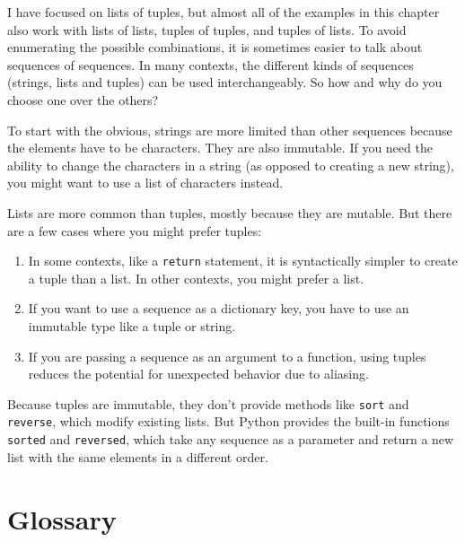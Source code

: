 I have focused on lists of tuples, but almost all of the examples in
this chapter also work with lists of lists, tuples of tuples, and
tuples of lists.  To avoid enumerating the possible combinations, it
is sometimes easier to talk about sequences of sequences.
%
In many contexts, the different kinds of sequences (strings, lists and
tuples) can be used interchangeably.  So how and why do you choose one
over the others?


To start with the obvious, strings are more limited than other
sequences because the elements have to be characters.  They are
also immutable.  If you need the ability to change the characters
in a string (as opposed to creating a new string), you might
want to use a list of characters instead.

Lists are more common than tuples, mostly because they are mutable.
But there are a few cases where you might prefer tuples:

\begin{enumerate}

\item In some contexts, like a {\tt return} statement, it is
syntactically simpler to create a tuple than a list.  In other
contexts, you might prefer a list.

\item If you want to use a sequence as a dictionary key, you
have to use an immutable type like a tuple or string.

\item If you are passing a sequence as an argument to a function,
using tuples reduces the potential for unexpected behavior
due to aliasing.

\end{enumerate}

Because tuples are immutable, they don't provide methods
like {\tt sort} and {\tt reverse}, which modify existing lists.
But Python provides the built-in functions {\tt sorted}
and {\tt reversed}, which take any sequence as a parameter
and return a new list with the same elements in a different
order.



\section{Glossary}
	

